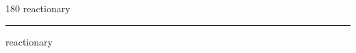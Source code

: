 
\begin{frame}
\begin{center}
\begin{turn}{180}
{\fontsize{2.5cm}{1em}\selectfont reactionary}
\end{turn}
\vspace{1em}\par  
\hrule
\vspace{1em}\par  
{\fontsize{2.5cm}{1em}\selectfont reactionary}
\end{center}
\end{frame}
